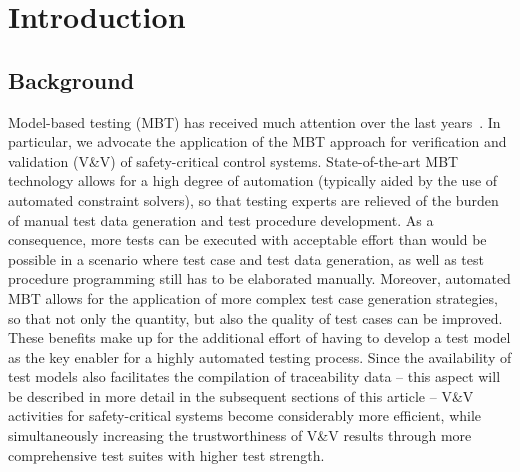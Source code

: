 \section{Introduction}
\label{sec:intro}
\subsection{Background}

Model-based testing (MBT) has received much attention over the last years~\cite{Petrenko:2012:MTS:2347096.2347101,DBLP:journals/jss/AnandBCCCGHHMOE13}. In particular, 
we advocate the application of 
the MBT approach for verification and validation (V\&V) of safety-critical control systems. State-of-the-art MBT technology allows for a high degree of automation 
(typically aided by the use of automated constraint solvers), so
that testing experts are relieved of 
the burden of manual test data generation and test procedure development. 
As a consequence, more tests can be executed with acceptable effort 
than would be possible in a scenario where test case and test data generation, as well
as test procedure programming still has to be elaborated manually. Moreover,
automated MBT allows for the application of more complex test case generation strategies,
so that not only the quantity, but also the quality of test cases can be improved.
These benefits make up for the additional effort of having to develop a test model 
as the key enabler for a highly automated testing process. Since the availability
of test models also facilitates the compilation of traceability data -- this aspect will
be described in more detail in the subsequent sections of this article -- 
V\&V  activities for safety-critical systems become considerably more efficient,
while simultaneously increasing the trustworthiness of V\&V results through 
more comprehensive test suites with higher test strength.

